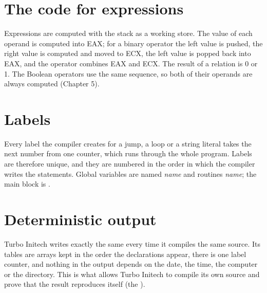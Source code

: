 \section{The code for expressions}
Expressions are computed with the stack as a working store.  The value of
each operand is computed into EAX; for a binary operator the left value is
pushed, the right value is computed and moved to ECX, the left value is
popped back into EAX, and the operator combines EAX and ECX.  The result of
a relation is 0 or 1.  The Boolean operators use the same sequence, so both
of their operands are always computed (Chapter 5).

\section{Labels}
Every label the compiler creates for a jump, a loop or a string literal
takes the next number from one counter, which runs through the whole
program.  Labels are therefore unique, and they are numbered in the order
in which the compiler writes the statements.  Global variables are named
\textit{name} and routines \textit{name}; the main block
is .

\section{Deterministic output}
Turbo Initech writes exactly the same  every time it
compiles the same source.  Its tables are arrays kept in the order the
declarations appear, there is one label counter, and nothing in the output
depends on the date, the time, the computer or the directory.  This is what
allows Turbo Initech to compile its own source and prove that the result
reproduces itself (the ).
